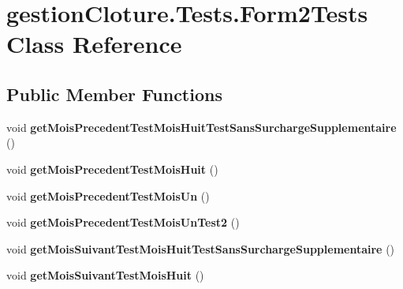 \hypertarget{classgestion_cloture_1_1_tests_1_1_form2_tests}{}\section{gestion\+Cloture.\+Tests.\+Form2\+Tests Class Reference}
\label{classgestion_cloture_1_1_tests_1_1_form2_tests}
\subsection*{Public Member Functions}
\begin{DoxyCompactItemize}
\item 
\mbox{\label{classgestion_cloture_1_1_tests_1_1_form2_tests_af9775db0974be3db118b1275b72cf692}} 
void {\bfseries get\+Mois\+Precedent\+Test\+Mois\+Huit\+Test\+Sans\+Surcharge\+Supplementaire} ()
\item 
\mbox{\label{classgestion_cloture_1_1_tests_1_1_form2_tests_ace669c5f7e6eefe931751ff4527bbbde}} 
void {\bfseries get\+Mois\+Precedent\+Test\+Mois\+Huit} ()
\item 
\mbox{\label{classgestion_cloture_1_1_tests_1_1_form2_tests_a2b224f69e866628d9164cc95d758718b}} 
void {\bfseries get\+Mois\+Precedent\+Test\+Mois\+Un} ()
\item 
\mbox{\label{classgestion_cloture_1_1_tests_1_1_form2_tests_a780750b1ce2508aee39d6669663ca6df}} 
void {\bfseries get\+Mois\+Precedent\+Test\+Mois\+Un\+Test2} ()
\item 
\mbox{\label{classgestion_cloture_1_1_tests_1_1_form2_tests_ac43a355dcd24368d9f6e986f59200ac6}} 
void {\bfseries get\+Mois\+Suivant\+Test\+Mois\+Huit\+Test\+Sans\+Surcharge\+Supplementaire} ()
\item 
\mbox{\label{classgestion_cloture_1_1_tests_1_1_form2_tests_a057814d030eb30a4e54246ec50543fec}} 
void {\bfseries get\+Mois\+Suivant\+Test\+Mois\+Huit} ()
\item 

\end{DoxyCompactItemize}
